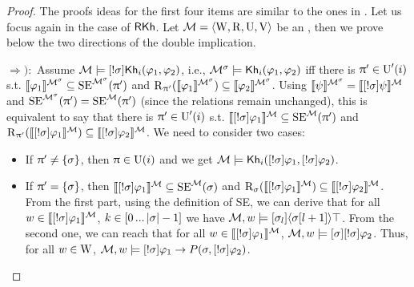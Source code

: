 \begin{proof}

The proofs ideas for the first four items are similar to the ones in . Let us focus again in the case of $\axm{RKh}$.  
Let $\modults = \tup{\W, \R, \Unc, \V}$ be an \ults, then we prove below the two directions of the double implication.

$\Rightarrow):$ Assume $\modults \models \srefbox{\plan} \khi(\varphi_1,\varphi_2)$, i.e.,  $\modults^\plan \models \khi(\varphi_1,\varphi_2)$ iff there is $\plans' \in \Unc'(i)$ s.t. $\truthset{\modults^\plan}{\varphi_1} \subseteq \stexec^{\modults^\plan}(\plans')$ and $\R_{\plans'}(\truthset{\modults^\plan}{\varphi_1}) \subseteq \truthset{\modults^\plan}{\varphi_2}$.
Using $\truthset{\modults^\plan}{\psi} = \truthset{\modults}{\srefbox{\plan} \psi}$ and $\stexec^{\modults^\plan}(\plans') = \stexec^\modults(\plans')$ (since the relations remain unchanged), this is equivalent to say that there is $\plans' \in \Unc'(i)$ s.t. $\truthset{\modults}{\srefbox{\plan} \varphi_1} \subseteq \stexec^\modults(\plans')$ and $\R_{\plans'}(\truthset{\modults}{\srefbox{\plan} \varphi_1}) \subseteq \truthset{\modults}{\srefbox{\plan} \varphi_2}$. We need to consider two cases:
\begin{itemize}
\item If $\plans' \neq \set{\plan}$, then $\plans \in \Unc(i)$ and we get $\modults \models \khi(\srefbox{\plan}\varphi_1,\srefbox{\plan}\varphi_2)$.
\item If $\plans' = \set{\plan}$, then $\truthset{\modults}{\srefbox{\plan}\varphi_1} \subseteq \stexec^\modults(\plan)$ and $\R_\plan(\truthset{\modults}{\srefbox{\plan}\varphi_1}) \subseteq \truthset{\modults}{\srefbox{\plan}\varphi_2}$.
From the first part, using the definition of SE, we can derive that for all $w \in \truthset{\modults}{\srefbox{\plan}\varphi_1}$, $k \in \intint{0}{\card{\plan}-1}$ we have $\modults,w \models \mlbox{\plan_l}\mldiam{\plan[l+1]}\top$.
From the second one, we can reach that for all $w \in \truthset{\modults}{\srefbox{\plan}\varphi_1}$, $\modults,w \models \mlbox{\plan} \srefbox{\plan}\varphi_2$.
Thus, for all $w \in \W$, $\modults,w \models \srefbox{\plan} \varphi_1 \ra P(\plan,\srefbox{\plan}\varphi_2)$.
\end{itemize}


\end{proof}
